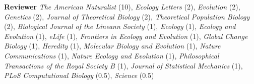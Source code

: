 \documentclass[12pt]{article}
\begin{document}
{\noindent \textbf{Reviewer} \textit{The American Naturalist} (10), \textit{Ecology Letters} (2), \textit{Evolution} (2), \textit{Genetics} (2), \textit{Journal of Theoretical Biology} (2), \textit{Theoretical Population Biology} (2), \textit{Biological Journal of the Lineann Society} (1), \textit{Ecology} (1), \textit{Ecology and Evolution} (1), \textit{eLife} (1), \textit{Frontiers in Ecology and Evolution} (1), \textit{Global Change Biology} (1), \textit{Heredity} (1), \textit{Molecular Biology and Evolution} (1), \textit{Nature Communications} (1), \textit{Nature Ecology and Evolution} (1), \textit{Philosophical Transactions of the Royal Society B} (1), \textit{Journal of Statistical Mechanics} (1), \textit{PLoS Computational Biology} (0.5), \textit{Science} (0.5)

%

}
\end{document}

